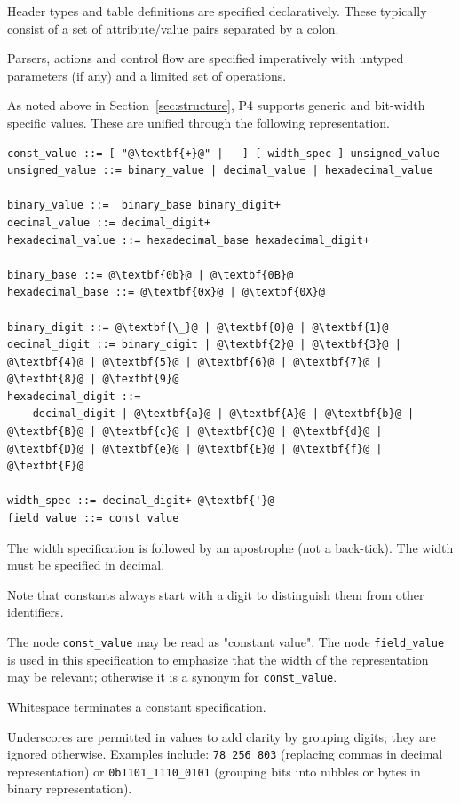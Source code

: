 \documentclass[12pt]{article}
\begin{document}
Header types and table definitions are specified declaratively.  These
typically consist of a set of attribute/value pairs separated by a
colon.

Parsers, actions and control flow are specified imperatively with
untyped parameters (if any) and a limited set of operations.


As noted above in Section~\ref{sec:structure}, P4 supports
generic and bit-width specific values. These are unified through the following
representation.

\begin{lstlisting}[frame=single,backgroundcolor=\color{bnfgreen},escapechar=\@]
const_value ::= [ "@\textbf{+}@" | - ] [ width_spec ] unsigned_value
unsigned_value ::= binary_value | decimal_value | hexadecimal_value

binary_value ::=  binary_base binary_digit+
decimal_value ::= decimal_digit+
hexadecimal_value ::= hexadecimal_base hexadecimal_digit+

binary_base ::= @\textbf{0b}@ | @\textbf{0B}@
hexadecimal_base ::= @\textbf{0x}@ | @\textbf{0X}@

binary_digit ::= @\textbf{\_}@ | @\textbf{0}@ | @\textbf{1}@
decimal_digit ::= binary_digit | @\textbf{2}@ | @\textbf{3}@ | @\textbf{4}@ | @\textbf{5}@ | @\textbf{6}@ | @\textbf{7}@ | @\textbf{8}@ | @\textbf{9}@
hexadecimal_digit ::=
    decimal_digit | @\textbf{a}@ | @\textbf{A}@ | @\textbf{b}@ | @\textbf{B}@ | @\textbf{c}@ | @\textbf{C}@ | @\textbf{d}@ | @\textbf{D}@ | @\textbf{e}@ | @\textbf{E}@ | @\textbf{f}@ | @\textbf{F}@

width_spec ::= decimal_digit+ @\textbf{'}@
field_value ::= const_value
\end{lstlisting}

The width specification is followed by an apostrophe (not a back-tick). The
width must be specified in decimal.

Note that constants always start with a digit to distinguish them from other
identifiers.

The node \texttt{const_value} may be read as "constant value". The node \texttt{field_value} is
used in this specification to emphasize that the width of the representation
may be relevant; otherwise it is a synonym for \texttt{const_value}.

Whitespace terminates a constant specification.

Underscores are permitted in values to add clarity by grouping digits; they
are ignored otherwise.  Examples include: \texttt{78_256_803} (replacing commas
in decimal representation) or \texttt{0b1101_1110_0101} (grouping bits into nibbles
or bytes in binary representation).
\end{document}
